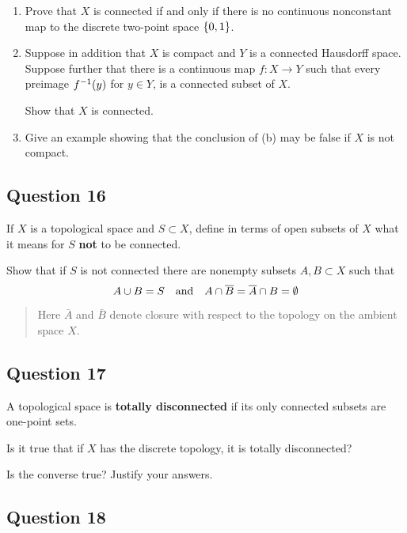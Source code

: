 \documentclass[12pt]{article}
\begin{document}
\begin{enumerate}
\def\labelenumi{\alph{enumi}.}
\item
  Prove that \(X\) is connected if and only if there is no continuous
  nonconstant map to the discrete two-point space \(\left\{{0, 1}\right\}\).
\item
  Suppose in addition that \(X\) is compact and \(Y\) is a connected
  Hausdorff space. Suppose further that there is a continuous map
  \(f : X \to Y\) such that every preimage \(f^{-1} (y)\) for
  \(y \in Y\), is a connected subset of \(X\).

  Show that \(X\) is connected.
\item
  Give an example showing that the conclusion of (b) may be false if
  \(X\) is not compact.
\end{enumerate}

\hypertarget{question-16-3}{%
\subsection{Question 16}\label{question-16-3}}

If \(X\) is a topological space and \(S \subset X\), define in terms of
open subsets of \(X\) what it means for \(S\) \textbf{not} to be
connected.

Show that if \(S\) is not connected there are nonempty subsets
\(A, B \subset X\) such that \[
A \cup B = S {\quad \operatorname{and} \quad} A \cap \overline{B} = \overline{A} \cap B = \emptyset
\]

\begin{quote}
Here \(\bar A\) and \(\bar B\) denote closure with respect to the
topology on the ambient space \(X\).
\end{quote}

\hypertarget{question-17-3}{%
\subsection{Question 17}\label{question-17-3}}

A topological space is \textbf{totally disconnected} if its only
connected subsets are one-point sets.

Is it true that if \(X\) has the discrete topology, it is totally
disconnected?

Is the converse true? Justify your answers.

\hypertarget{question-18-3}{%
\subsection{Question 18}\label{question-18-3}}
\end{document}

